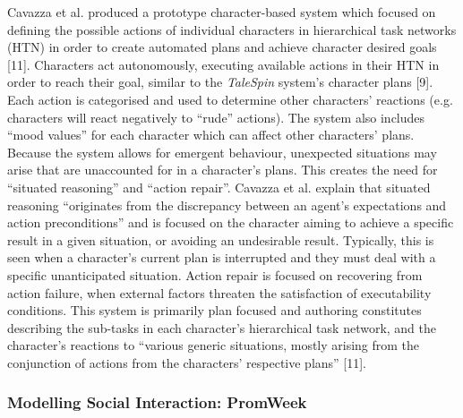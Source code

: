 \documentclass{sig-alternate-05-2015}
\begin{document}
Cavazza et al. produced a prototype character-based system which focused on defining the possible actions of individual characters in hierarchical task networks (HTN) in order to create automated plans and achieve character desired goals [11]. Characters act autonomously, executing available actions in their HTN in order to reach their goal, similar to the \textit{TaleSpin} system's character plans [9].  Each action is categorised and used to determine other characters' reactions (e.g. characters will react negatively to ``rude'' actions). The system also includes ``mood values'' for each character which can affect other characters' plans. Because the system allows for emergent behaviour, unexpected situations may arise that are unaccounted for in a character's plans. This creates the need for ``situated reasoning'' and ``action repair''. Cavazza et al. explain that situated reasoning ``originates from the discrepancy between an agent's expectations and action preconditions'' and is focused on the character aiming to achieve a specific result in a given situation, or avoiding an undesirable result. Typically, this is seen when a character's current plan is interrupted and they must deal with a specific unanticipated situation. Action repair is focused on recovering from action failure, when external factors threaten the satisfaction of executability conditions. This system is primarily plan focused and authoring constitutes describing the sub-tasks in each character's hierarchical task network, and the character's reactions to ``various generic situations, mostly arising
from the conjunction of actions from the characters'
respective plans'' [11].\\ 

\subsubsection{Modelling Social Interaction: PromWeek}
\end{document}
